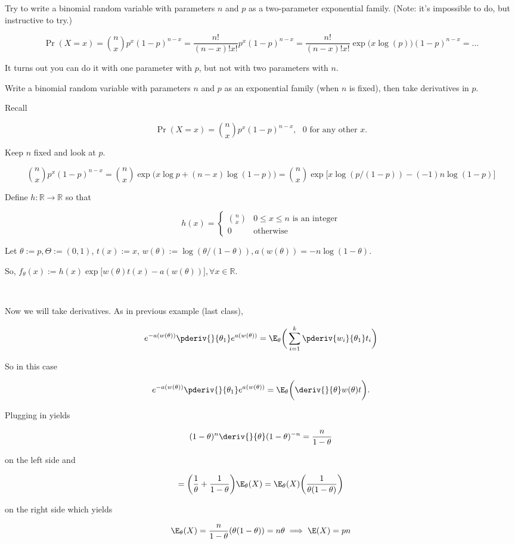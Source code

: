\begin{exercise} Try to write a binomial random variable with parameters \(n\) and \(p\) as a two-parameter exponential family. (Note: it's impossible to do, but instructive to try.)

\[
\Pr(X=x) = \binom{n}{x} p^x (1-p)^{n-x} = \frac{n!}{(n-x)!x!}  p^x (1-p)^{n-x} = \frac{n!}{(n-x)!x!}  \exp \big( x \log(p) \big) (1-p)^{n-x} = \ldots
\]

It turns out you can do it with one parameter with \(p\), but not with two parameters with \(n\).

\end{exercise}

\begin{example}\label{prob.math541a.ex.3.15} Write a binomial random variable with parameters \(n\) and \(p\) as an exponential family (when \(n\) is fixed), then take derivatives in \(p\).

Recall

\[
\Pr(X=x) = \binom{n}{x} p^x (1-p)^{n-x}, \ \ \ 0 \text{ for any other } x.
\]

Keep \(n\) fixed and look at \(p\).

\[
\binom{n}{x}p^x(1-p)^{n-x} = \binom{n}{x} \exp \big( x \log p + (n-x) \log(1-p) \big) = \binom{n}{x} \exp \big[ x \log(p/(1-p)) - (-1) n \log(1-p)  \big] 
\]

Define \(h: \mathbb{R} \to \mathbb{R}\) so that 

\[
h(x) = \begin{cases}
\binom{n}{x} & 0 \leq x \leq n \text{ is an integer} \\
0 & \text{otherwise}
\end{cases}
\]

Let \( \theta:=p, \Theta := (0, 1) \), \(t(x) := x\), \(w(\theta):= \log(\theta/(1-\theta)), a(w(\theta)) = -n \log(1-\theta)\).

So, \(f_\theta(x) := h(x) \exp \big[ w(\theta) t(x) - a (w(\theta)) \big], \forall x \in \mathbb{R}\).

\

Now we will take derivatives. As in previous example (last class),

\[
e^{-a (w(\theta))} \pderiv{}{\theta_1} e^{a(w(\theta))} = \E_{\theta} \bigg( \sum_{i=1}^k \pderiv{w_i}{\theta_1} t_i \bigg)
\]

So in this case

\[
e^{-a (w(\theta))} \pderiv{}{\theta_1} e^{a(w(\theta))} = \E_{\theta} \bigg( \deriv{}{\theta} w(\theta) t \bigg).
\]

Plugging in yields 

\[
(1-\theta)^n  \deriv{}{\theta} (1- \theta)^{-n} = \frac{n}{1-\theta} 
\]

on the left side and

\[
= \bigg( \frac{1}{\theta} + \frac{1}{1- \theta} \bigg) \E_{\theta}(X) = \E_\theta(X) \bigg( \frac{1}{\theta(1-\theta)} \bigg) 
\]

on the right side which yields

\[
\E_\theta(X) = \frac{n}{1-\theta} (\theta(1-\theta)) = n \theta \implies \E(X) = pn
\]

\end{example}

